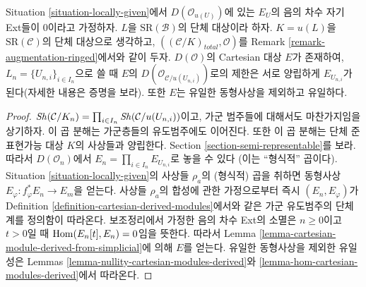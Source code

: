 \begin{lemma}
\label{lemma-prepare-bbd-glueing}
Situation \ref{situation-locally-given}에서
$D(\mathcal{O}_{u(U)})$에 있는 $E_U$의 음의 차수 자기 Ext들이
0이라고 가정하자. $L$을 $\text{SR}(\mathcal{B})$의 단체 대상이라 하자.
$K = u(L)$을 $\text{SR}(\mathcal{C})$의 단체 대상으로 생각하고,
$((\mathcal{C}/K)_{total}, \mathcal{O})$를 Remark
\ref{remark-augmentation-ringed}에서와 같이 두자.
$D(\mathcal{O})$의 Cartesian 대상 $E$가 존재하여,
$L_n = \{U_{n, i}\}_{i \in I_n}$으로 쓸 때 $E$의
$D(\mathcal{O}_{\mathcal{C}/u(U_{n, i})})$로의 제한은 서로 양립하게
$E_{U_{n, i}}$가 된다(자세한 내용은 증명을 보라).
또한 $E$는 유일한 동형사상을 제외하고 유일하다.
\end{lemma}

\begin{proof}
$\mathop{\mathit{Sh}}\nolimits(\mathcal{C}/K_n) = \prod_{i \in I_n} \mathop{\mathit{Sh}}\nolimits(\mathcal{C}/u(U_{n, i}))$이고,
가군 범주들에 대해서도 마찬가지임을 상기하자. 이 곱 분해는
가군층들의 유도범주에도 이어진다. 또한 이 곱 분해는 단체
준표현가능 대상 $K$의 사상들과 양립한다. Section
\ref{section-semi-representable}를 보라. 따라서 $D(\mathcal{O}_n)$에서
$E_n = \prod_{i \in I_n} E_{U_{n, i}}$로 놓을 수 있다
(이는 ``형식적'' 곱이다). Situation \ref{situation-locally-given}의
사상들 $\rho_a$의 (형식적) 곱을 취하면 동형사상
$E_\varphi : f_\varphi^*E_n \to E_m$을 얻는다.
사상들 $\rho_a$의 합성에 관한 가정으로부터 즉시
$(E_n, E_\varphi)$가 Definition
\ref{definition-cartesian-derived-modules}에서와 같은 가군 유도범주의
단체 계를 정의함이 따라온다. 보조정리에서 가정한 음의 차수 Ext의
소멸은 $n \geq 0$이고 $t > 0$일 때
$\mathop{\mathrm{Hom}}\nolimits(E_n[t], E_n) = 0$임을 뜻한다. 따라서 Lemma
\ref{lemma-cartesian-module-derived-from-simplicial}에 의해 $E$를 얻는다.
유일한 동형사상을 제외한 유일성은 Lemmas
\ref{lemma-nullity-cartesian-modules-derived}와
\ref{lemma-hom-cartesian-modules-derived}에서 따라온다.
\end{proof}

